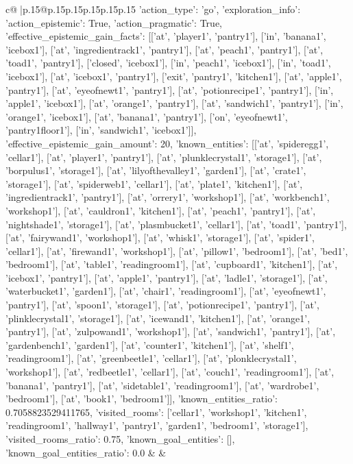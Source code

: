 \documentclass{article}
\begin{document}
{\begin{supertabular}{c@{$\;$}|p{.15\linewidth}@{}p{.15\linewidth}p{.15\linewidth}p{.15\linewidth}p{.15\linewidth}p{.15\linewidth}}
{{{	 {'action_type': 'go', 'exploration_info': {'action_epistemic': True, 'action_pragmatic': True, 'effective_epistemic_gain_facts': [['at', 'player1', 'pantry1'], ['in', 'banana1', 'icebox1'], ['at', 'ingredientrack1', 'pantry1'], ['at', 'peach1', 'pantry1'], ['at', 'toad1', 'pantry1'], ['closed', 'icebox1'], ['in', 'peach1', 'icebox1'], ['in', 'toad1', 'icebox1'], ['at', 'icebox1', 'pantry1'], ['exit', 'pantry1', 'kitchen1'], ['at', 'apple1', 'pantry1'], ['at', 'eyeofnewt1', 'pantry1'], ['at', 'potionrecipe1', 'pantry1'], ['in', 'apple1', 'icebox1'], ['at', 'orange1', 'pantry1'], ['at', 'sandwich1', 'pantry1'], ['in', 'orange1', 'icebox1'], ['at', 'banana1', 'pantry1'], ['on', 'eyeofnewt1', 'pantry1floor1'], ['in', 'sandwich1', 'icebox1']], 'effective_epistemic_gain_amount': 20, 'known_entities': [['at', 'spideregg1', 'cellar1'], ['at', 'player1', 'pantry1'], ['at', 'plunklecrystal1', 'storage1'], ['at', 'borpulus1', 'storage1'], ['at', 'lilyofthevalley1', 'garden1'], ['at', 'crate1', 'storage1'], ['at', 'spiderweb1', 'cellar1'], ['at', 'plate1', 'kitchen1'], ['at', 'ingredientrack1', 'pantry1'], ['at', 'orrery1', 'workshop1'], ['at', 'workbench1', 'workshop1'], ['at', 'cauldron1', 'kitchen1'], ['at', 'peach1', 'pantry1'], ['at', 'nightshade1', 'storage1'], ['at', 'plasmbucket1', 'cellar1'], ['at', 'toad1', 'pantry1'], ['at', 'fairywand1', 'workshop1'], ['at', 'whisk1', 'storage1'], ['at', 'spider1', 'cellar1'], ['at', 'firewand1', 'workshop1'], ['at', 'pillow1', 'bedroom1'], ['at', 'bed1', 'bedroom1'], ['at', 'table1', 'readingroom1'], ['at', 'cupboard1', 'kitchen1'], ['at', 'icebox1', 'pantry1'], ['at', 'apple1', 'pantry1'], ['at', 'ladle1', 'storage1'], ['at', 'waterbucket1', 'garden1'], ['at', 'chair1', 'readingroom1'], ['at', 'eyeofnewt1', 'pantry1'], ['at', 'spoon1', 'storage1'], ['at', 'potionrecipe1', 'pantry1'], ['at', 'plinklecrystal1', 'storage1'], ['at', 'icewand1', 'kitchen1'], ['at', 'orange1', 'pantry1'], ['at', 'zulpowand1', 'workshop1'], ['at', 'sandwich1', 'pantry1'], ['at', 'gardenbench1', 'garden1'], ['at', 'counter1', 'kitchen1'], ['at', 'shelf1', 'readingroom1'], ['at', 'greenbeetle1', 'cellar1'], ['at', 'plonklecrystal1', 'workshop1'], ['at', 'redbeetle1', 'cellar1'], ['at', 'couch1', 'readingroom1'], ['at', 'banana1', 'pantry1'], ['at', 'sidetable1', 'readingroom1'], ['at', 'wardrobe1', 'bedroom1'], ['at', 'book1', 'bedroom1']], 'known_entities_ratio': 0.7058823529411765, 'visited_rooms': ['cellar1', 'workshop1', 'kitchen1', 'readingroom1', 'hallway1', 'pantry1', 'garden1', 'bedroom1', 'storage1'], 'visited_rooms_ratio': 0.75, 'known_goal_entities': [], 'known_goal_entities_ratio': 0.0}} 
	  } 
	   } 
	   } 
	 & & \\ 
 


\end{supertabular}}
\end{document}
